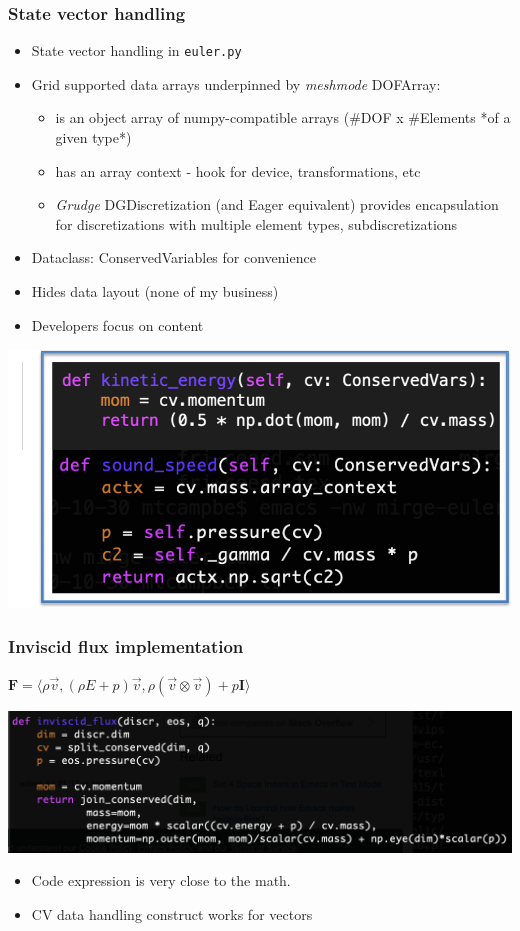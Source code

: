 \begin{frame}\frametitle{State vector handling}
\begin{multicols}{2}
\begin{itemize}
  \item State vector handling in \texttt{euler.py}
  \item Grid supported data arrays underpinned by \textit{meshmode} DOFArray:
  \begin{itemize}
    \item is an object array of numpy-compatible arrays (\#DOF x \#Elements *of a given type*)
    \item has an array context - hook for device, transformations, etc
    \item \textit{Grudge} DGDiscretization (and Eager equivalent)  provides encapsulation for discretizations with multiple element types, subdiscretizations
  \end{itemize}
  \item Dataclass: ConservedVariables for convenience
  \item Hides data layout (none of my business)
  \item Developers focus on content
\end{itemize}
\end{multicols}
\begin{center}
\includegraphics[width=.5\textwidth]{figures/eos_sample.png}
\end{center}
\end{frame}


\begin{frame}\frametitle{Inviscid flux implementation}
$\mathbf{F} = \langle\rho\vec{v}, (\rho{E} + p)\vec{v}, \rho(\vec{v}\otimes\vec{v}) + p\mathbf{I}\rangle$
\begin{center}
\includegraphics[width=\textwidth]{figures/inviscid_flux.png}
\end{center}
\begin{itemize}
  \item Code expression is very close to the math.
  \item CV data handling construct works for vectors
\end{itemize}
\end{frame}

